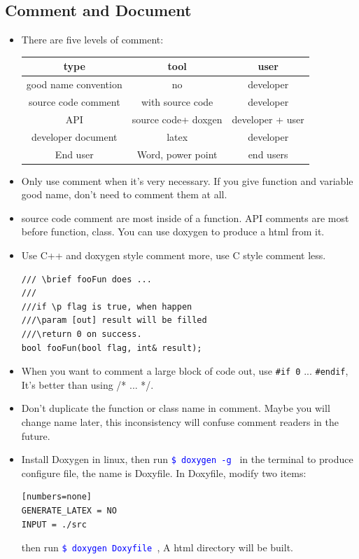 \documentclass[a4paper,11pt,twoside]{book}
\newcommand{\linuxcommand}[1]{\texttt{\textcolor{blue}{\$ #1 \Pisymbol{psy}{191}}}}
\newcommand{\tophline}{\hline }
\newcommand{\bottomhline}{\\ \hline }
\newcommand{\tophline}{ }
\newcommand{\bottomhline}{ }
\begin{document}
\subsection{Comment and Document}

\begin{itemize}
	\item There are five levels of comment: \\
	\begin{tabular}{|c|c|c|}
		\tophline 
		type & tool & user \\ 
		\tophline 
		good name convention & no & developer  \\ 
		\tophline 
		source code comment & with source code &  developer \\ 
		\tophline 
		API & source code+ doxgen  & developer + user  \\ 
		\tophline 
		developer document & latex &  developer \\ 
		\tophline 
		End user & Word, power point & end users 
		\bottomhline 
	\end{tabular} 
	
	\item Only use comment when it's very necessary. If you give function and variable good name, don't need to comment them at all. 
	
	\item source code comment are most inside of a function. API comments are most before function, class. You can use doxygen to produce a html from it. 
	
	\item Use C++ and doxygen style comment more, use C style comment less.
	
\begin{lstlisting}[numbers=none]
/// \brief fooFun does ...
///
///if \p flag is true, when happen
///\param [out] result will be filled
///\return 0 on success.
bool fooFun(bool flag, int& result);
\end{lstlisting}
	
	\item When you want to comment a large block of code out, use \texttt{\#if 0} ...  \texttt{\#endif}, It's better than using /* ... */. 
	
	\item Don't duplicate the function or class name in comment. Maybe you will change name later, this inconsistency will confuse comment readers in the future.
	
	\item Install Doxygen in linux, then run \linuxcommand{doxygen -g} in the terminal to produce configure file, the name is Doxyfile.  In Doxyfile, modify two items:
\begin{verbatim}[numbers=none]
GENERATE_LATEX = NO
INPUT = ./src
\end{verbatim}
	then run \linuxcommand{doxygen Doxyfile}, A html directory will be built.
	

\end{itemize}
\end{document}
